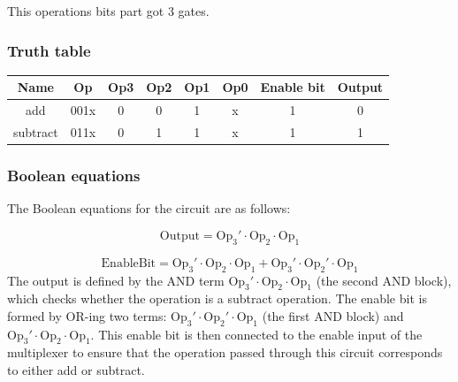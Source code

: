 \documentclass{article}
\begin{document}
\hspace{2em}This operations bits part got 3 gates.
\subsubsection{Truth table}
\begin{table}[h!]
\centering
\begin{tabular}{|c|c|c|c|c|c|c|c|}
\hline
\textbf{Name} & \textbf{Op} & \textbf{Op3} & \textbf{Op2} & \textbf{Op1} & \textbf{Op0} & \textbf{Enable bit} & \textbf{Output} \\ \hline
add           & 001x        & 0            & 0            & 1            & x            & 1                  & 0               \\ \hline
subtract      & 011x        & 0            & 1            & 1            & x            & 1                  & 1               \\ \hline
\end{tabular}
\end{table}
\subsubsection{Boolean equations}
The Boolean equations for the circuit are as follows:

\[
\text{Output} = \text{Op}_3' \cdot \text{Op}_2 \cdot \text{Op}_1
\]

\[
\text{EnableBit} = \text{Op}_3' \cdot \text{Op}_2 \cdot \text{Op}_1 + \text{Op}_3' \cdot \text{Op}_2' \cdot \text{Op}_1
\]
The output is defined by the AND term \(\text{Op}_3' \cdot \text{Op}_2 \cdot \text{Op}_1\) (the second AND block), which checks whether the operation is a subtract operation. The enable bit is formed by OR-ing two terms: \(\text{Op}_3' \cdot \text{Op}_2' \cdot \text{Op}_1\) (the first AND block) and \(\text{Op}_3' \cdot \text{Op}_2 \cdot \text{Op}_1\). This enable bit is then connected to the enable input of the multiplexer to ensure that the operation passed through this circuit corresponds to either add or subtract.
\end{document}
